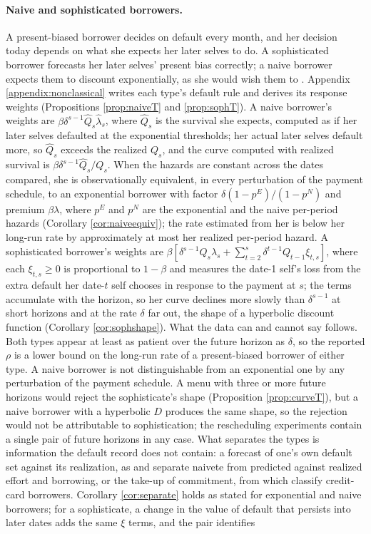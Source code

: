 \documentclass[12pt,english]{article}
\begin{document}
\paragraph{Naive and sophisticated borrowers.} A present-biased borrower decides on default every month, and her decision today depends on what she expects her later selves to do. A sophisticated borrower forecasts her later selves' present bias correctly; a naive borrower expects them to discount exponentially, as she would wish them to \citep{odonoghue_doing_1999, odonoghue_choice_2001}. Appendix \ref{appendix:nonclassical} writes each type's default rule and derives its response weights (Propositions \ref{prop:naiveT} and \ref{prop:sophT}). A naive borrower's weights are $\beta\delta^{s-1}\hat Q_s\hat\lambda_s$, where $\hat Q_s$ is the survival she expects, computed as if her later selves defaulted at the exponential thresholds; her actual later selves default more, so $\hat Q_s$ exceeds the realized $Q_s$, and the curve computed with realized survival is $\beta\delta^{s-1}\hat Q_s/Q_s$. When the hazards are constant across the dates compared, she is observationally equivalent, in every perturbation of the payment schedule, to an exponential borrower with factor $\delta(1-p^E)/(1-p^N)$ and premium $\beta\lambda$, where $p^E$ and $p^N$ are the exponential and the naive per-period hazards (Corollary \ref{cor:naiveequiv}); the rate estimated from her is below her long-run rate by approximately at most her realized per-period hazard. A sophisticated borrower's weights are $\beta[\delta^{s-1}Q_s\lambda_s + \sum_{t=2}^{s}\delta^{t-1}Q_{t-1}\xi_{t,s}]$, where each $\xi_{t,s} \ge 0$ is proportional to $1-\beta$ and measures the date-1 self's loss from the extra default her date-$t$ self chooses in response to the payment at $s$; the terms accumulate with the horizon, so her curve declines more slowly than $\delta^{s-1}$ at short horizons and at the rate $\delta$ far out, the shape of a hyperbolic discount function (Corollary \ref{cor:sophshape}). What the data can and cannot say follows. Both types appear at least as patient over the future horizon as $\delta$, so the reported $\rho$ is a lower bound on the long-run rate of a present-biased borrower of either type. A naive borrower is not distinguishable from an exponential one by any perturbation of the payment schedule. A menu with three or more future horizons would reject the sophisticate's shape (Proposition \ref{prop:curveT}), but a naive borrower with a hyperbolic $D$ produces the same shape, so the rejection would not be attributable to sophistication; the rescheduling experiments contain a single pair of future horizons in any case. What separates the types is information the default record does not contain: a forecast of one's own default set against its realization, as \citet{augenblick_experiment_2019} and \citet{allcott_are_2022} separate naivete from predicted against realized effort and borrowing, or the take-up of commitment, from which \citet{kuchler_sticking_2021} classify credit-card borrowers. Corollary \ref{cor:separate} holds as stated for exponential and naive borrowers; for a sophisticate, a change in the value of default that persists into later dates adds the same $\xi$ terms, and the pair identifies 
\end{document}
